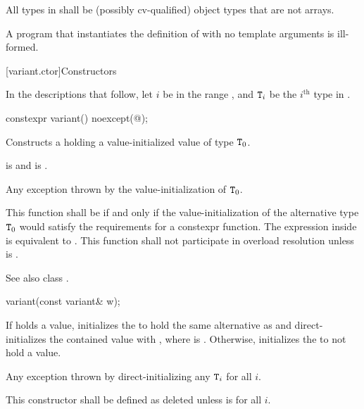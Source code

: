 \pnum
All types in  shall be (possibly cv-qualified)
object types that are not arrays.

\pnum
A program that instantiates the definition of  with
no template arguments is ill-formed.

[variant.ctor]{Constructors}

\pnum
In the descriptions that follow, let $i$ be in the range ,
and $\texttt{T}_i$ be the $i^\text{th}$ type in .

%
\begin{itemdecl}
constexpr variant() noexcept(@\seebelow@);
\end{itemdecl}

\begin{itemdescr}
\pnum
\effects
Constructs a  holding a value-initialized value of type $\texttt{T}_0$.

\pnum
\postconditions
{} is  and  is .

\pnum
\throws
Any exception thrown by the value-initialization of $\texttt{T}_0$.

\pnum
\remarks
This function shall be  if and only if the
value-initialization of the alternative type $\texttt{T}_0$ would satisfy the
requirements for a constexpr function.
The expression inside  is equivalent to
.
This function shall not participate in overload resolution unless
 is .
\begin{note} See also class . \end{note}
\end{itemdescr}

%
\begin{itemdecl}
variant(const variant& w);
\end{itemdecl}

\begin{itemdescr}
\pnum
\effects
If  holds a value, initializes the  to hold the same
alternative as  and direct-initializes the contained value
with , where  is .
Otherwise, initializes the  to not hold a value.

\pnum
\throws
Any exception thrown by direct-initializing any $\texttt{T}_i$ for all $i$.

\pnum
\remarks
This constructor shall be defined as deleted unless
 is  for all $i$.
\end{itemdescr}

